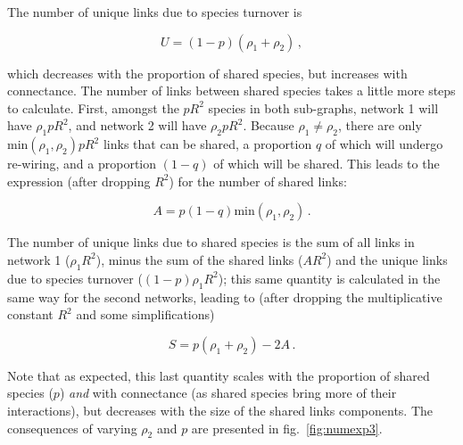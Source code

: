 \documentclass[11pt]{article}
\begin{document}
The number of unique links due to species turnover is

\[U = (1-p)(\rho_1 + \rho_2)\,,\]

which decreases with the proportion of shared species, but increases
with connectance. The number of links between shared species takes a
little more steps to calculate. First, amongst the \(pR^2\) species in
both sub-graphs, network 1 will have \(\rho_1 pR^2\), and network 2 will
have \(\rho_2 pR^2\). Because \(\rho_1 \neq \rho_2\), there are only
\(\text{min}(\rho_1, \rho_2)pR^2\) links that can be shared, a
proportion \(q\) of which will undergo re-wiring, and a proportion
\((1-q)\) of which will be shared. This leads to the expression (after
dropping \(R^2\)) for the number of shared links:

\[A = p (1-q) \text{min}(\rho_1, \rho_2)\,.\]

The number of unique links due to shared species is the sum of all links
in network 1 (\(\rho_1 R^2\)), minus the sum of the shared links
(\(AR^2\)) and the unique links due to species turnover
(\((1-p)\rho_1R^2\)); this same quantity is calculated in the same way
for the second networks, leading to (after dropping the multiplicative
constant \(R^2\) and some simplifications)

\[S = p (\rho_1 + \rho_2) - 2A\,.\]

Note that as expected, this last quantity scales with the proportion of
shared species (\(p\)) \emph{and} with connectance (as shared species
bring more of their interactions), but decreases with the size of the
shared links components. The consequences of varying \(\rho_2\) and
\(p\) are presented in fig.~\ref{fig:numexp3}.
\end{document}
